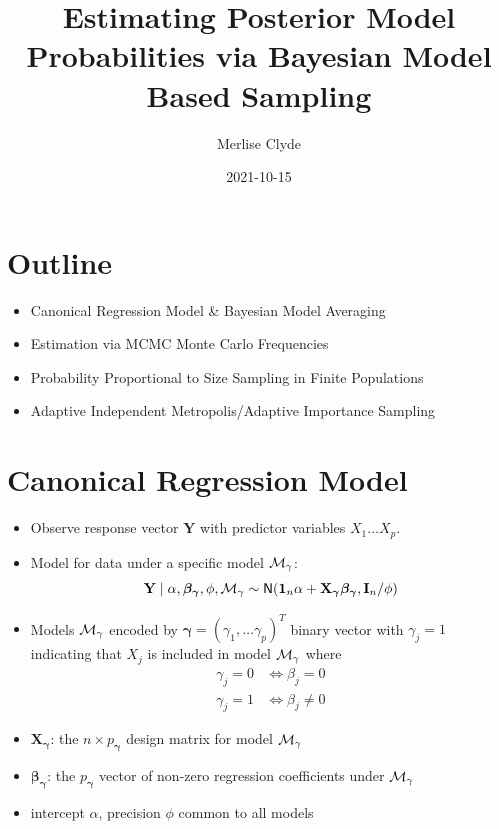 \documentclass[
]{report}
\title{Estimating Posterior Model Probabilities via Bayesian Model Based
Sampling}
\author{Merlise Clyde}
\date{2021-10-15}
\newcommand{\N}{\textsf{N}}
\newcommand{\1}{\mathbf{1}_n}
\newcommand{\I}{\mathbf{I}}
\newcommand{\Y}{\mathbf{Y}}
\def\Xg{\mathbf{X}_{\boldsymbol{\gamma}}}
\def\one{\mathbf{1}}
\def\bg{\boldsymbol{\beta_\gamma}}
\def\Mg{{\boldsymbol{{\cal M}_\gamma}}}
\def\g{\boldsymbol{\gamma}}
\def\Mg{{\cal M}_\gamma}
\def\pg{p_{\boldsymbol{\gamma}}}
\begin{document}
\maketitle


\section{Outline}\label{outline}

\begin{itemize}
\item
  Canonical Regression Model \& Bayesian Model Averaging
\item
  Estimation via MCMC Monte Carlo Frequencies
\item
  Probability Proportional to Size Sampling in Finite Populations
\item
  Adaptive Independent Metropolis/Adaptive Importance Sampling
\end{itemize}

\section{Canonical Regression Model}\label{canonical-regression-model}

\begin{itemize}
\item
  Observe response vector \(\Y\) with predictor variables \(X_1 \dots
  X_p\).
\item
  Model for data under a specific model \(\Mg\): \begin{equation*}
  \Y \mid \alpha, \bg, \phi, \Mg \sim \N(\one_n\alpha + \Xg \bg, \I_n/\phi)
  \label{eq:linear.model}
  \end{equation*}
\item
  Models \(\Mg\) encoded by \(\g = (\gamma_1, \ldots \gamma_p)^T\)
  binary vector with \(\gamma_j = 1\) indicating that \(X_j\) is
  included in model \(\Mg\) where \begin{align*}
  \gamma_j = 0 & \Leftrightarrow \beta_j = 0 \\
  \gamma_j = 1 &  \Leftrightarrow \beta_j \neq 0 
  \end{align*}
\item
  \(\Xg\): the \(n \times \pg\) design matrix for model \(\Mg\)
\item
  \(\bg\): the \(\pg\) vector of non-zero regression coefficients under
  \(\Mg\)
\item
  intercept \(\alpha\), precision \(\phi\) common to all models
\end{itemize}
\end{document}
